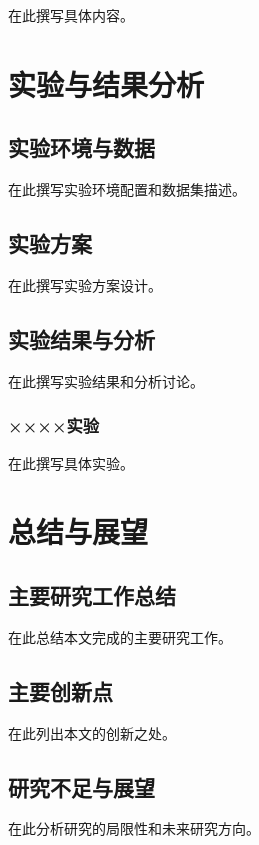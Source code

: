 \documentclass[12pt, a4paper, openany]{ltjbook}
\begin{document}
在此撰写具体内容。

\chapter{实验与结果分析}

\section{实验环境与数据}

在此撰写实验环境配置和数据集描述。

\section{实验方案}

在此撰写实验方案设计。

\section{实验结果与分析}

在此撰写实验结果和分析讨论。

\subsection{××××实验}

在此撰写具体实验。

\chapter{总结与展望}

\section{主要研究工作总结}

在此总结本文完成的主要研究工作。

\section{主要创新点}

在此列出本文的创新之处。

\section{研究不足与展望}

在此分析研究的局限性和未来研究方向。
\end{document}
